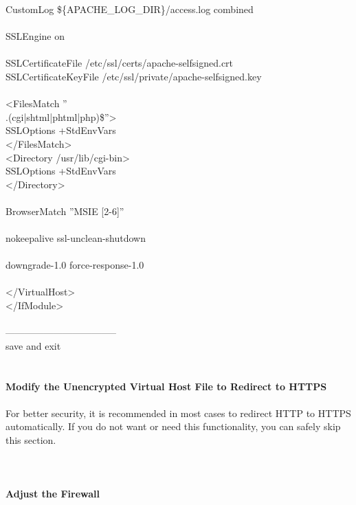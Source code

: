 \documentclass[10pt,a4paper]{article}
\begin{document}
{{{{{{{{{{{{{{{{                CustomLog \$\{APACHE\_LOG\_DIR\}/access.log combined\\
\\
                SSLEngine on\\
\\
                SSLCertificateFile      /etc/ssl/certs/apache-selfsigned.crt}{\large \\
                SSLCertificateKeyFile /etc/ssl/private/apache-selfsigned.key}{\large \\
\\
                <FilesMatch ''\\.(cgi|shtml|phtml|php)\$''>\\
                                SSLOptions +StdEnvVars\\
                </FilesMatch>\\
                <Directory /usr/lib/cgi-bin>}{\large \\
                                SSLOptions +StdEnvVars\\
                </Directory>\\
\\
                BrowserMatch ''MSIE [2-6]'' \\\\
                               nokeepalive ssl-unclean-shutdown \\\\
                               downgrade-1.0 force-response-1.0\\
\\
        </VirtualHost>\\
</IfModule>\\
\\
-----------------------------------\\
save and exit\\
\\
\\
\textbf{Modify the Unencrypted Virtual Host File to Redirect to HTTPS}}{\large \\
\\
For better security, it is recommended in most cases to redirect HTTP to HTTPS automatically. If you do not want or need this functionality, you can safely skip this section.\\
\\
[I'll skip]\\
\\
\textbf{Adjust the Firewall}}{\large \\
\\
}}}}}}}}}}}}}}}}
\end{document}
